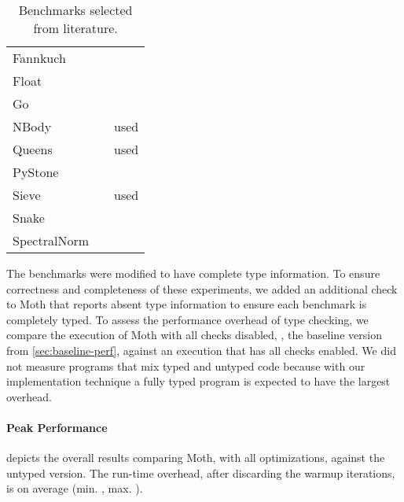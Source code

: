 \begin{table}[htb]
  \caption{Benchmarks selected from literature.}
  \label{tab:gradual-benchmarks}
  \begin{center}
    \begin{tabular}{l l r}
      Fannkuch & \cite{Vitousek2017,Greenman2018} \\
      Float & \cite{Vitousek2017,Muehlboeck2017,Greenman2018} \\
      Go & \cite{Vitousek2017,Muehlboeck2017,Greenman2018} \\
      NBody & \cite{Kuhlenschmidt:2018:preprint,Vitousek2017,Greenman2018} & used \cite{Marr2016} \\
      Queens & \cite{Vitousek2017,Muehlboeck2017,Greenman2018} & used \cite{Marr2016} \\
      PyStone & \cite{Vitousek2017,Muehlboeck2017,Greenman2018} \\
      Sieve & \cite{Takikawa2016,Muehlboeck2017,Bauman2017,Richards2017} & used \cite{Marr2016} \\
      Snake & \cite{Takikawa2016,Muehlboeck2017,Bauman2017,Richards2017} \\
      SpectralNorm & \cite{Vitousek2017,Muehlboeck2017,Greenman2018} \\
    \end{tabular}
  \end{center}
\end{table}

The benchmarks were modified to have complete type information.
To ensure correctness and completeness of these experiments,
we added an additional check to Moth that
reports absent type information to ensure each benchmark is completely typed.
To assess the performance overhead of type checking,
we compare the execution of Moth with all checks disabled, \ie, the baseline version from
\cref{sec:baseline-perf}, against an execution that has all checks enabled.
We did not measure programs that mix typed and untyped code
because with our implementation technique a fully typed program is expected to
have the largest overhead.

\paragraph*{Peak Performance}

 depicts
the overall results comparing Moth,
with all optimizations,
against the untyped version.
The run-time overhead,
after discarding the warmup iterations,
is on average
\OverheadTypingGMeanP (min. \OverheadTypingMinP, max. \OverheadTypingMaxP).

